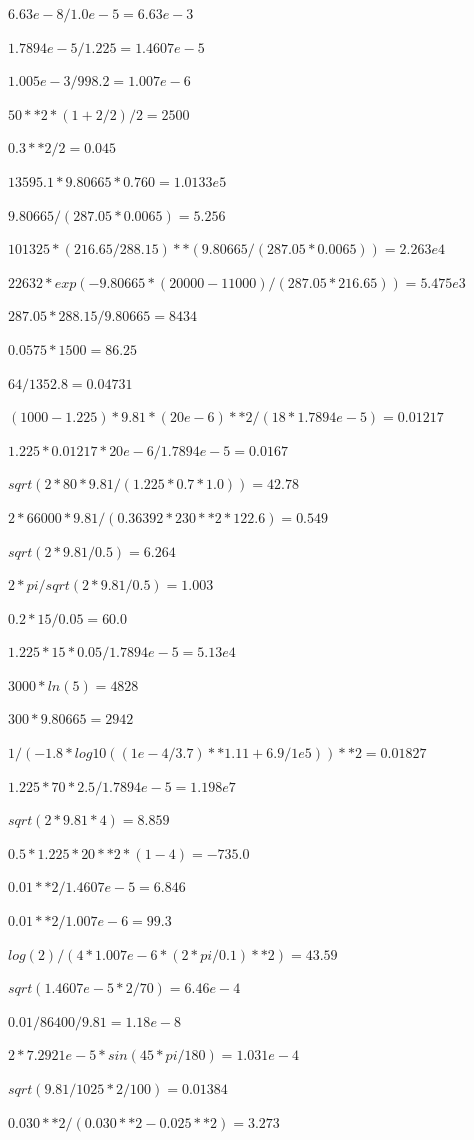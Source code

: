 \documentclass[10pt,openany]{book}
\begin{document}
\(6.63e-8/1.0e-5 = 6.63e-3\)

\(1.7894e-5/1.225 = 1.4607e-5\)

\(1.005e-3/998.2 = 1.007e-6\)

\(50**2*(1 + 2/2)/2 = 2500\)

\(0.3**2/2 = 0.045\)

\(13595.1*9.80665*0.760 = 1.0133e5\)

\(9.80665/(287.05*0.0065) = 5.256\)

\(101325*(216.65/288.15)**(9.80665/(287.05*0.0065)) = 2.263e4\)

\(22632*exp(-9.80665*(20000 - 11000)/(287.05*216.65)) = 5.475e3\)

\(287.05*288.15/9.80665 = 8434\)

\(0.0575*1500 = 86.25\)

\(64/1352.8 = 0.04731\)

\((1000 - 1.225)*9.81*(20e-6)**2/(18*1.7894e-5) = 0.01217\)

\(1.225*0.01217*20e-6/1.7894e-5 = 0.0167\)

\(sqrt(2*80*9.81/(1.225*0.7*1.0)) = 42.78\)

\(2*66000*9.81/(0.36392*230**2*122.6) = 0.549\)

\(sqrt(2*9.81/0.5) = 6.264\)

\(2*pi/sqrt(2*9.81/0.5) = 1.003\)

\(0.2*15/0.05 = 60.0\)

\(1.225*15*0.05/1.7894e-5 = 5.13e4\)

\(3000*ln(5) = 4828\)

\(300*9.80665 = 2942\)

\(1/(-1.8*log10((1e-4/3.7)**1.11 + 6.9/1e5))**2 = 0.01827\)

\(1.225*70*2.5/1.7894e-5 = 1.198e7\)

\(sqrt(2*9.81*4) = 8.859\)

\(0.5*1.225*20**2*(1 - 4) = -735.0\)

\(0.01**2/1.4607e-5 = 6.846\)

\(0.01**2/1.007e-6 = 99.3\)

\(log(2)/(4*1.007e-6*(2*pi/0.1)**2) = 43.59\)

\(sqrt(1.4607e-5*2/70) = 6.46e-4\)

\(0.01/86400/9.81 = 1.18e-8\)

\(2*7.2921e-5*sin(45*pi/180) = 1.031e-4\)

\(sqrt(9.81/1025*2/100) = 0.01384\)

\(0.030**2/(0.030**2 - 0.025**2) = 3.273\)
\end{document}
